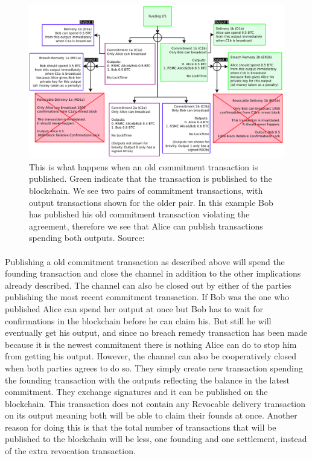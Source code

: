\begin{figure}[h]
    \centering
    \includegraphics[width=14cm]{figures/ln_breach.png}
    \caption{This is what happens when an old commitment transaction is published. Green indicate that the transaction is published to the blockchain. We see two pairs of commitment transactions, with output transactions shown for the older pair. In this example Bob has published his old commitment transaction violating the agreement, therefore we see that Alice can publish transactions spending both outputs. Source: \cite{poon2015bitcoin}}
    \label{fig:ln_breach}
\end{figure}

\paragraph{}
Publishing a old commitment transaction as described above will spend the founding transaction and close the channel in addition to the other implications already described.
The channel can also be closed out by either of the parties publishing the most recent commitment transaction. If Bob was the one who published Alice can spend her output at once but Bob has to wait for confirmations in the blockchain before he can claim his. But still he will eventually get his output, and since no breach remedy transaction has been made because it is the newest commitment there is nothing Alice can do to stop him from getting his output.
However, the channel can also be cooperatively closed when both parties agrees to do so. They simply create new transaction spending the founding transaction with the outputs reflecting the balance in the latest commitment. They exchange signatures and it can be published on the blockchain. This transaction does not contain any Revocable delivery transaction on its output meaning both will be able to claim their founds at once. 
Another reason for doing this is that the total number of transactions that will be published to the blockchain will be less, one founding and one settlement, instead of the extra revocation transaction.

